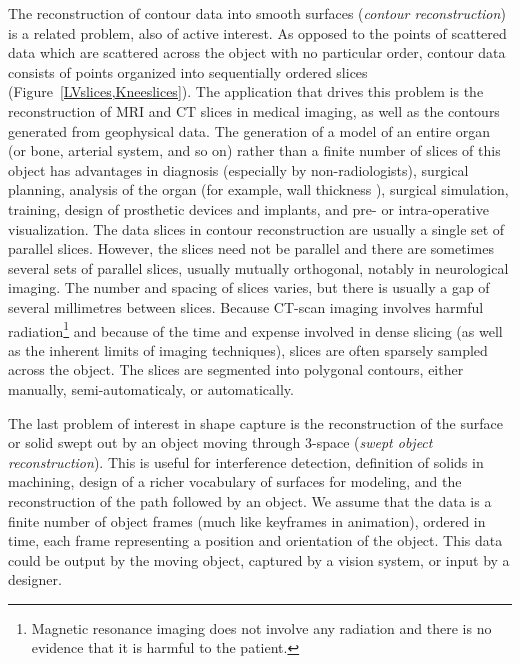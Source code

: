 The reconstruction of contour data into smooth surfaces
({\em contour reconstruction}) is a related problem, also of active interest.
As opposed to the points of scattered data which are scattered across the
object with no particular order,
contour data consists of points organized into sequentially ordered slices
(Figure~\ref{LVslices,Kneeslices}).
The application that drives this problem is 
the reconstruction of MRI and CT slices in medical imaging,
as well as the contours generated from geophysical data.
The generation of a model of an entire organ (or bone, arterial system, and so on)
rather than a finite number of slices of this object
has advantages in diagnosis (especially by non-radiologists),
surgical planning, analysis of the organ (for example, 
wall thickness \cite{jjsloanCIC95}), surgical simulation,
training, design of prosthetic devices and implants, 
and pre- or intra-operative visualization.
The data slices in contour reconstruction are usually a single set 
of parallel slices.
However, the slices need not be parallel and there are sometimes
several sets of parallel slices, usually mutually orthogonal,
notably in neurological imaging.
The number and spacing of slices varies, but there is usually a gap
of several millimetres between slices.
Because CT-scan imaging involves harmful radiation\footnote{Magnetic resonance
	imaging does not involve any radiation and there is no evidence
	that it is harmful to the patient.}
and because of the time and expense involved in dense slicing (as well
as the inherent limits of imaging techniques), 
slices are often sparsely sampled across the object.
The slices are segmented into polygonal contours, either manually, semi-automaticaly,
or automatically.

The last problem of interest in shape capture 
is the reconstruction of the surface or solid swept out
by an object moving through 3-space ({\em swept object reconstruction}).
This is useful for interference detection, definition of solids in machining,
design of a richer vocabulary of surfaces for modeling,
and the reconstruction of the path followed by an object.
We assume that the data is a finite number of object frames (much like
keyframes in animation), ordered in time, each frame representing
a position and orientation of the object.
This data could be output by the moving object, captured by a vision system,
or input by a designer.

